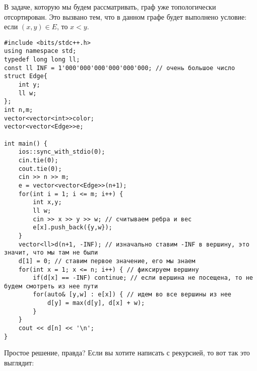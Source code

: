 \documentclass{article}
\begin{document}
    \begin{center}
    \end{center}

В задаче, которую мы будем рассматривать, граф уже топологически отсортирован. Это вызвано тем, что в данном графе будет выполнено условие: если $(x,y) \in E$, то $x < y$. 

\begin{verbatim}
#include <bits/stdc++.h>
using namespace std;
typedef long long ll;
const ll INF = 1'000'000'000'000'000'000; // очень большое число 
struct Edge{
    int y;
    ll w;
};
int n,m;
vector<vector<int>>color;
vector<vector<Edge>>e;

int main() {
    ios::sync_with_stdio(0);
    cin.tie(0);
    cout.tie(0);
    cin >> n >> m;
    e = vector<vector<Edge>>(n+1);
    for(int i = 1; i <= m; i++) {
        int x,y;
        ll w;
        cin >> x >> y >> w; // считываем ребра и вес
        e[x].push_back({y,w});
    }
    vector<ll>d(n+1, -INF); // изначально ставим -INF в вершину, это значит, что мы там не были
    d[1] = 0; // ставим первое значение, его мы знаем
    for(int x = 1; x <= n; i++) { // фиксируем вершину
        if(d[x] == -INF) continue; // если вершина не посещена, то не будем смотреть из нее пути
        for(auto& [y,w] : e[x]) { // идем во все вершины из нее
            d[y] = max(d[y], d[x] + w); 
        }
    }
    cout << d[n] << '\n';
}
\end{verbatim}

Простое решение, правда? Если вы хотите написать с рекурсией, то вот так это выглядит: 
\end{document}
